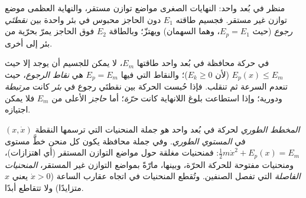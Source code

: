 \begin{omfigure}

{\small منظر  في بُعد واحد: النهايات الصغرى مواضع توازن
مستقر، والنهاية العظمى موضع توازن غير مستقر. فجسيم طاقته $E_1$
دون الحاجز محبوس في بئر واحدة بين \emph{نقطتَي
رجوع} (حيث $E_p = E_1$، وهما السهمان) ويهتزّ؛ وبالطاقة $E_2$ فوق
الحاجز يمرّ بحرّية من بئر إلى أخرى.}
\end{omfigure}

\begin{definition}\label{def:b1:work-and-energy:turning}
في حركة محافظة في بُعد واحد طاقتها $E_m$، لا يمكن للجسيم أن
يوجد إلا حيث $E_p(x) \leq E_m$ (لأن $E_k \geq 0$)؛ والنقاط التي فيها
$E_p = E_m$ هي \emph{نقاط الرجوع}، حيث تنعدم السرعة ثم
تنقلب. فإذا حُبست الحركة بين نقطتَي رجوع في \emph{بئر }
كانت \emph{مرتبطة} ودورية؛ وإذا استطاعت بلوغ اللانهاية كانت
\emph{حرّة}؛ أما \emph{حاجز } الأعلى من $E_m$ فلا يمكن
اجتيازه.
\end{definition}

\begin{definition}\label{def:b1:work-and-energy:phase}
\emph{المخطط الطوري} لحركة في بُعد واحد هو جملة
المنحنيات التي ترسمها النقطة $(x, \dot x)$ في \emph{المستوي الطوري}. وفي
جملة محافظة يكون كل منحن خطَّ مستوى $\tfrac12 m\dot x^2 +
E_p(x) = E_m$: فمنحنيات مغلقة حول مواضع التوازن المستقر (أي اهتزازات)،
ومنحنيات مفتوحة للحركة الحرّة، وبينها، مارّةً بمواضع التوازن غير
المستقر، \emph{المنحنيات الفاصلة} التي تفصل الصنفين. وتُقطع المنحنيات في اتجاه عقارب الساعة
($\dot x > 0$ يعني $x$ متزايدًا) ولا تتقاطع أبدًا.
\end{definition}

